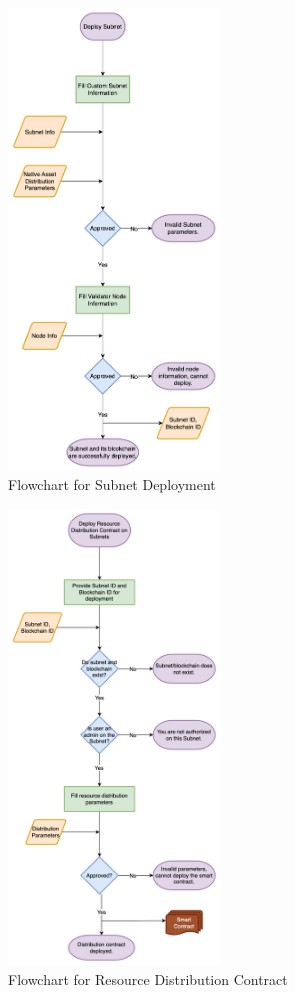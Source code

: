 \documentclass[a4paper,12pt]{report}
\begin{document}
\begin{figure}[H]
	\centering
	\includegraphics[width=0.5\textwidth]{flow1.png}
	\caption{Flowchart for Subnet Deployment
	}
\end{figure}
\begin{figure}[H]
	\centering
	\includegraphics[width=0.5\textwidth]{flow2.png}
	\caption{Flowchart for Resource Distribution Contract}
\end{figure}
\end{document}
